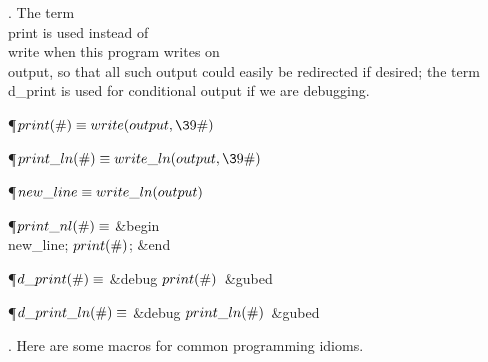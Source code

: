 . The term \\{print} is used instead of \\{write} when this program writes
on
\\{output}, so that all such output could easily be redirected if desired;
the term \\{d\_print} is used for conditional output if we are debugging.

\Y\P\D {}$\\{print}(\#)\S\\{write}(\\{output},\39\#)$\par
\P\D {}$\\{print\_ln}(\#)\S\\{write\_ln}(\\{output},\39\#)$\par
\P\D {}$\\{new\_line}\S\\{write\_ln}(\\{output})$\par
\P\D {}$\\{print\_nl}(\#)\S$\6
\&{begin} \\{new\_line};\5
$\\{print}(\#)$;\6
\&{end}\Y\par
\P\D {}$\\{d\_print}(\#)\S$\1\6
\&{debug} $\\{print}(\#)$\ \&{gubed}\2\par
\P\D {}$\\{d\_print\_ln}(\#)\S$\1\6
\&{debug} $\\{print\_ln}(\#)$\ \&{gubed}\2\par
\fi

. Here are some macros for common programming idioms.

